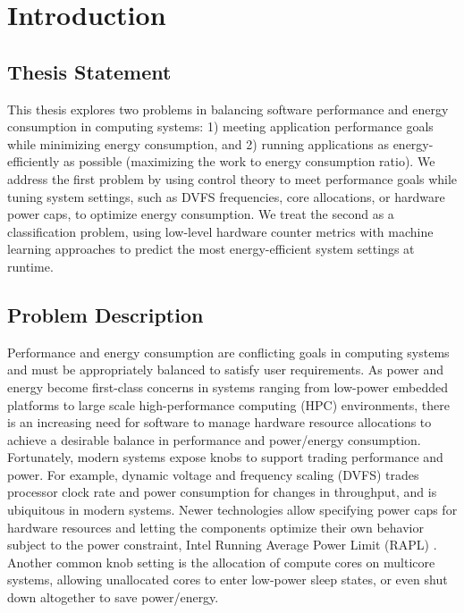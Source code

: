 \chapter{Introduction}
\label{sec:intro}

\section{Thesis Statement}

This thesis explores two problems in balancing software performance and energy consumption in computing systems: 1) meeting application performance goals while minimizing energy consumption, and 2) running applications as energy-efficiently as possible (maximizing the work to energy consumption ratio).
We address the first problem by using control theory to meet performance goals while tuning system settings, such as DVFS frequencies, core allocations, or hardware power caps, to optimize energy consumption.
We treat the second as a classification problem, using low-level hardware counter metrics with machine learning approaches to predict the most energy-efficient system settings at runtime.


\section{Problem Description}
\label{sec:intro-description}

Performance and energy consumption are conflicting goals in computing systems and must be appropriately balanced to satisfy user requirements.
As power and energy become first-class concerns in systems ranging from low-power embedded platforms to large scale high-performance computing (HPC) environments, there is an increasing need for software to manage hardware resource allocations to achieve a desirable balance in performance and power/energy consumption.
Fortunately, modern systems expose knobs to support trading performance and power.
For example, dynamic voltage and frequency scaling (DVFS) trades processor clock rate and power consumption for changes in throughput, and is ubiquitous in modern systems.
Newer technologies allow specifying power caps for hardware resources and letting the components optimize their own behavior subject to the power constraint, \eg Intel Running Average Power Limit (RAPL) \cite{RAPL}.
Another common knob setting is the allocation of compute cores on multicore systems, allowing unallocated cores to enter low-power sleep states, or even shut down altogether to save power/energy.

